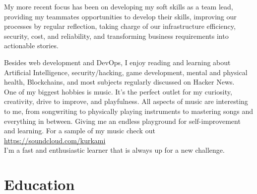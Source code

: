 \documentclass[10pt]{article} %
\begin{document}
My more recent focus has been on developing my soft skills as a team lead, providing my teammates opportunities to develop their skills, improving our processes by regular reflection, taking charge of our infrastructure efficiency, security, cost, and reliability, and transforming business requirements into actionable stories.

Besides web development and DevOps, I enjoy reading and learning about Artificial Intelligence, security/hacking, game development, mental and physical health, Blockchains, and most subjects regularly discussed on Hacker News. \\

One of my biggest hobbies is music. It's the perfect outlet for my curiosity, creativity, drive to improve, and playfulness. All aspects of music are interesting to me, from songwriting to physically playing instruments to mastering songs and everything in between. Giving me an endless playground for self-improvement and learning. For a sample of my music check out \href{https://soundcloud.com/kurkami}{https://soundcloud.com/kurkami}  \\

I'm a fast and enthusiastic learner that is always up for a new challenge.


\section{Education}



\end{document}
